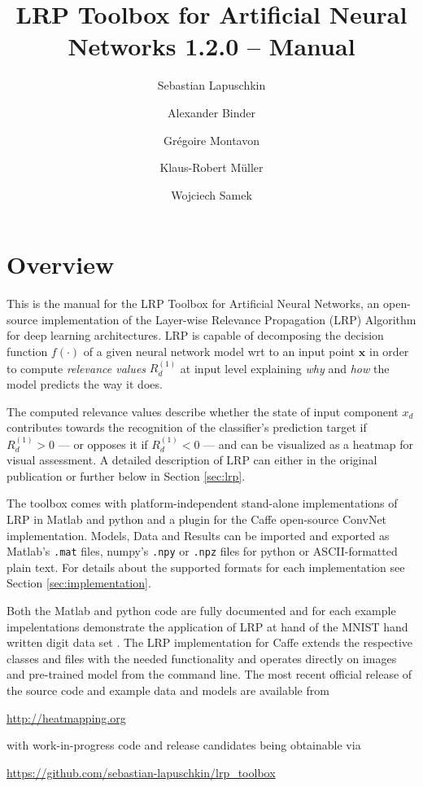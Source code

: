 \documentclass[a4wide]{article}
\newcommand{\x}{\boldsymbol{x}}
\begin{document}
\title{LRP Toolbox for Artificial Neural Networks 1.2.0 -- Manual}

\author{Sebastian Lapuschkin \and Alexander Binder \and Gr\'egoire Montavon \and Klaus-Robert M\"uller \and Wojciech Samek}

\maketitle

\tableofcontents

\newpage

\section{Overview}
This is the manual for the LRP Toolbox for Artificial Neural Networks, an open-source implementation of the Layer-wise Relevance Propagation (LRP)\cite{bach15} Algorithm for deep learning architectures. LRP is capable of decomposing the decision function $f(\cdot)$ of a given neural network model wrt to an input point $\x$ in order to compute \emph{relevance values} $R^{(1)}_d$ at input level explaining \emph{why} and \emph{how} the model predicts the way it does.

The computed relevance values describe whether the state of input component $x_d$ contributes towards the recognition of the classifier's prediction target if $R^{(1)}_d > 0$ --- or opposes it if $R^{(1)}_d < 0$ --- and can be visualized as a heatmap for visual assessment. A detailed description of LRP can either in the original publication \cite{bach15} or further below in Section \ref{sec:lrp}.

The toolbox comes with platform-independent stand-alone implementations of LRP in Matlab and python and a plugin for the Caffe \cite{jia2014caffe} open-source ConvNet implementation. Models, Data and Results can be imported and exported as Matlab's \texttt{.mat} files, numpy's \texttt{.npy} or \texttt{.npz} files for python or ASCII-formatted plain text. For details about the supported formats for each implementation see Section \ref{sec:implementation}. 

Both the Matlab and python code are fully documented and for each example impelentations demonstrate the application of LRP at hand of the MNIST hand written digit data set \cite{lecun1998mnist}.
The LRP implementation for Caffe extends the respective classes and files with the needed functionality and operates directly on images and pre-trained model from the command line.
The most recent official release of the source code and example data and models are available from 
\begin{center}
\url{http://heatmapping.org}
\end{center}
with work-in-progress code and release candidates being obtainable via
\begin{center}
\url{https://github.com/sebastian-lapuschkin/lrp_toolbox}
\end{center}
\end{document}
